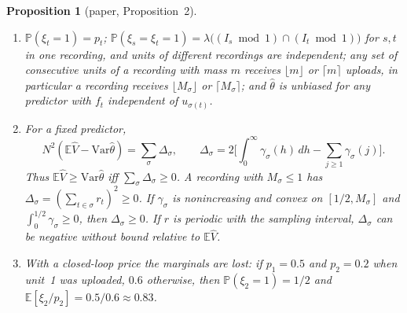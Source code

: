 \documentclass[11pt]{article}
\newtheorem{proposition}{Proposition}
\theoremstyle{remark}
\newcommand{\E}{\mathbb{E}}
\renewcommand{\Pr}{\mathbb{P}}
\newcommand{\Var}{\mathrm{Var}}
\newcommand{\hth}{\hat\theta}
\newcommand{\hV}{\hat V}
\begin{document}
\begin{proposition}[paper, Proposition~2]\label{prop:madow}
\begin{enumerate}[label=(\roman*)]
\item $\Pr(\xi_t=1)=p_t$; $\Pr(\xi_s=\xi_t=1)=\lambda\big((I_s\bmod1)\cap(I_t\bmod1)\big)$ for $s,t$ in one recording, and units of different recordings are independent; any set of consecutive units of a recording with mass $m$ receives $\lfloor m\rfloor$ or $\lceil m\rceil$ uploads, in particular a recording receives $\lfloor M_\sigma\rfloor$ or $\lceil M_\sigma\rceil$; and $\hth$ is unbiased for any predictor with $f_t$ independent of $u_{\sigma(t)}$.
\item For a fixed predictor,
\[
N^2(\E\hV-\Var\hth)=\sum_\sigma\Delta_\sigma,\qquad\Delta_\sigma=2\Big[\int_0^\infty\gamma_\sigma(h)\,dh-\sum_{j\ge1}\gamma_\sigma(j)\Big].
\]
Thus $\E\hV\ge\Var\hth$ iff $\sum_\sigma\Delta_\sigma\ge0$. A recording with $M_\sigma\le1$ has $\Delta_\sigma=(\sum_{t\in\sigma}r_t)^2\ge0$. If $\gamma_\sigma$ is nonincreasing and convex on $[1/2,M_\sigma]$ and $\int_0^{1/2}\gamma_\sigma\ge0$, then $\Delta_\sigma\ge0$. If $r$ is periodic with the sampling interval, $\Delta_\sigma$ can be negative without bound relative to $\E\hV$.
\item With a closed-loop price the marginals are lost: if $p_1=0.5$ and $p_2=0.2$ when unit~1 was uploaded, $0.6$ otherwise, then $\Pr(\xi_2=1)=1/2$ and $\E[\xi_2/p_2]=0.5/0.6\approx0.83$.
\end{enumerate}
\end{proposition}
\end{document}
